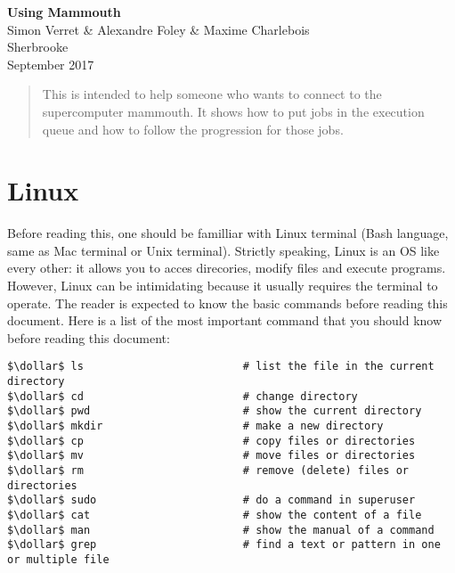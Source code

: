 \documentclass[10pt,letter]{article}
\newcommand{\dollar}{\mbox{\textdollar}}
\begin{document}

\begin{centering}

\Large{\textbf{Using Mammouth}}\\
\normalsize{Simon Verret \& Alexandre Foley \& Maxime Charlebois}\\
\small{Sherbrooke\\ September 2017}

\end{centering}



\begin{abstract}
This is intended to help someone who wants to connect to the supercomputer mammouth. It shows how to put jobs in the execution queue and how to follow the progression for those jobs.
\end{abstract}

\tableofcontents

\renewcommand{\baselinestretch}{1.00}
\setlength{\parskip}{0.8\baselineskip}
\setlength{\parindent}{0mm}


\vspace{2mm}

\section{Linux}
Before reading this, one should be familliar with Linux terminal 
(Bash language, same as Mac terminal or Unix terminal). 
Strictly speaking, Linux is an OS like every other: 
it allows you to acces direcories, modify files and execute programs. 
However, Linux can be intimidating because it usually requires the terminal to operate.
The reader is expected to know the basic commands before reading this document. 
Here is a list of the most important command that you should know before reading this document:

\begin{lstlisting}[style=BashInputStyle]
$\dollar$ ls                         # list the file in the current directory
$\dollar$ cd                         # change directory
$\dollar$ pwd                        # show the current directory
$\dollar$ mkdir                      # make a new directory
$\dollar$ cp                         # copy files or directories
$\dollar$ mv                         # move files or directories
$\dollar$ rm                         # remove (delete) files or directories
$\dollar$ sudo                       # do a command in superuser
$\dollar$ cat                        # show the content of a file
$\dollar$ man                        # show the manual of a command
$\dollar$ grep                       # find a text or pattern in one or multiple file
\end{lstlisting}
\end{document}
